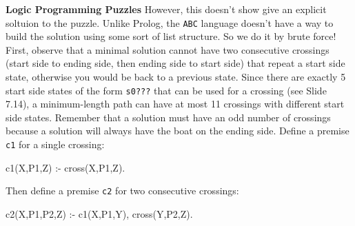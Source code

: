 \begin{minipage}[t]{\sw}
\slidenumber
\LARGE
{\bf Logic Programming Puzzles}\exx
However, this doesn't show give an explicit soltuion to the puzzle.
Unlike Prolog, the \verb'ABC' language doesn't have a way to build
the solution using some sort of list structure.
So we do it by brute force!\exx
First, observe that a minimal solution
cannot have two consecutive crossings
(start side to ending side, then ending side to start side)
that repeat a start side state,
otherwise you would be back to a previous state.
Since there are exactly 5 start side states of the form \verb's0???'
that can be used for a crossing
(see Slide 7.14),
a minimum-length path can have
at most 11 crossings with different start side states.
Remember that a solution must have an odd number of crossings
because a solution will always have the boat on the ending side.\exx
Define a premise \verb'c1' for a single crossing:
\begin{qv}
c1(X,P1,Z) :- cross(X,P1,Z). %
\end{qv}
Then define a premise \verb'c2' for two consecutive crossings:
\begin{qv}
c2(X,P1,P2,Z) :- c1(X,P1,Y), cross(Y,P2,Z). %
\end{qv}
\end{minipage}
